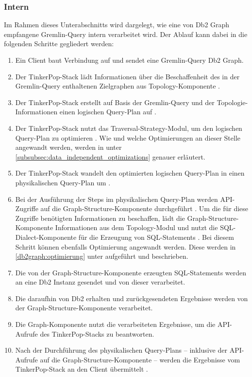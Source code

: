 \subsubsection{Intern}
Im Rahmen dieses Unterabschnitts wird dargelegt, wie eine von Db2 Graph empfangene Gremlin-Query intern verarbeitet wird. Der Ablauf kann dabei in die folgenden Schritte gegliedert werden: 

\begin{enumerate}
    \item Ein Client baut Verbindung auf und sendet eine Gremlin-Query Db2 Graph.
    \item Der TinkerPop-Stack lädt Informationen über die Beschaffenheit des in der Gremlin-Query enthaltenen Zielgraphen aus Topology-Komponente \cite{vldb_tian,sigmod_tian, yt_tian}.
    \item Der TinkerPop-Stack erstellt auf Basis der Gremlin-Query und der Topologie-Informationen einen logischen Query-Plan auf \cite{vldb_tian,sigmod_tian, yt_tian}. 
    \item Der TinkerPop-Stack nutzt das Traversal-Strategy-Modul, um den logischen Query-Plan zu optimieren \cite{vldb_tian,sigmod_tian, yt_tian}. Wie und welche Optimierungen an dieser Stelle angewandt werden, werden in  unter \autoref{subsubsec:data_independent_optimizations} genauer erläutert.
    \item Der TinkerPop-Stack wandelt den optimierten logischen Query-Plan in einen physikalischen Query-Plan um \cite{vldb_tian,sigmod_tian, yt_tian}. 
    \item Bei der Ausführung der Steps im physikalischen Query-Plan werden API-Zugriffe auf die Graph-Structure-Komponente durchgeführt \cite{vldb_tian,sigmod_tian, yt_tian}. Um die für diese Zugriffe benötigten Informationen zu beschaffen, lädt die Graph-Structure-Komponente Informationen aus dem Topology-Modul und nutzt die SQL-Dialect-Komponente für die Erzeugung von SQL-Statements \cite{vldb_tian,sigmod_tian, yt_tian}. Bei diesem Schritt können ebenfalls Optimierung angewandt werden. Diese werden in \autoref{db2graph:optimierung} unter  aufgeführt und beschrieben.
    \item Die von der Graph-Structure-Komponente erzeugten SQL-Statements werden an eine Db2 Instanz gesendet und von dieser verarbeitet. \cite{vldb_tian,sigmod_tian, yt_tian}
    \item Die daraufhin von Db2 erhalten und zurückgesendeten Ergebnisse werden von der Graph-Structure-Komponente verarbeitet. \cite{yt_tian} 
    \item Die Graph-Komponente nutzt die verarbeiteten Ergebnisse, um die API-Aufrufe des TinkerPop-Stacks zu beantworten. \cite{vldb_tian,sigmod_tian, yt_tian} 
    \item Nach der Durchführung des physikalischen Query-Plans -- inklusive der API-Aufrufe auf die Graph-Structure-Komponente -- werden die Ergebnisse vom TinkerPop-Stack an den Client übermittelt \cite{vldb_tian,sigmod_tian, yt_tian}.
\end{enumerate}

